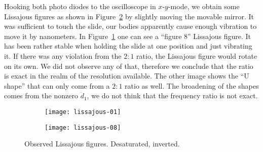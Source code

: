 \documentclass[11pt, english, fleqn, DIV=15, headinclude, BCOR=2cm]{scrreprt}
\begin{document}
Hooking both photo diodes to the oscilloscope in $x$-$y$-mode, we obtain some
Lissajous figures as shown in Figure~\ref{fig:lissajous-measured} by slightly
moving the movable mirror. It was sufficient to touch the slide, our bodies
apparently cause enough vibration to move it by nanometers. In
Figure~\ref{fig:lissajous-01} one can see a \enquote{figure 8} Lissajous
figure. It has been rather stable when holding the slide at one position and
just vibrating it. If there was any violation from the $2:1$ ratio, the
Lissajous figure would rotate on its own. We did not observe any of that,
therefore we conclude that the ratio is exact in the realm of the resolution
available. The other image shows the \enquote{U shape} that can only come from
a $2:1$ ratio as well. The broadening of the shapes comes from the nonzero
$\ddot d_1$, we do not think that the frequency ratio is not exact.

\begin{figure}
    \centering
    \begin{subfigure}[c]{0.48\linewidth}
        \centering
        \texttt{[image: lissajous-01]}
        \caption{%
            }
        \label{fig:lissajous-01}
    \end{subfigure}
    \hfill
    \begin{subfigure}[c]{0.48\linewidth}
        \centering
        \texttt{[image: lissajous-08]}
        \caption{%
            }
    \end{subfigure}
    \caption{%
        Observed Lissajous figures. Desaturated, inverted.
        }
    \label{fig:lissajous-measured}
\end{figure}

\end{document}
